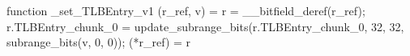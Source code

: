 function _set_TLBEntry_v1 (r_ref, v) = {
    r = __bitfield_deref(r_ref);
    r.TLBEntry_chunk_0 = update_subrange_bits(r.TLBEntry_chunk_0, 32, 32, subrange_bits(v, 0, 0));
    (*r_ref) = r
}
